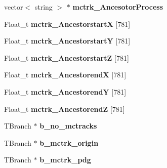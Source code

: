 \begin{DoxyCompactItemize}
\item 
\hypertarget{classanatree_a8e3f9971eb270265c29ed2363adf4b3d}{vector$<$ string $>$ $\ast$ {\bfseries mctrk\-\_\-\-Ancesotor\-Process}}\label{classanatree_a8e3f9971eb270265c29ed2363adf4b3d}

\item 
\hypertarget{classanatree_aee584eb9b9a6e4e342b671cef755f317}{Float\-\_\-t {\bfseries mctrk\-\_\-\-Ancestorstart\-X} \mbox{[}781\mbox{]}}\label{classanatree_aee584eb9b9a6e4e342b671cef755f317}

\item 
\hypertarget{classanatree_afe86037877e2e9a9c34088e9e9969212}{Float\-\_\-t {\bfseries mctrk\-\_\-\-Ancestorstart\-Y} \mbox{[}781\mbox{]}}\label{classanatree_afe86037877e2e9a9c34088e9e9969212}

\item 
\hypertarget{classanatree_ab9b2693c0fcd6663997e3f30a5e2e283}{Float\-\_\-t {\bfseries mctrk\-\_\-\-Ancestorstart\-Z} \mbox{[}781\mbox{]}}\label{classanatree_ab9b2693c0fcd6663997e3f30a5e2e283}

\item 
\hypertarget{classanatree_a72139522f1128add159c12ea49251a3e}{Float\-\_\-t {\bfseries mctrk\-\_\-\-Ancestorend\-X} \mbox{[}781\mbox{]}}\label{classanatree_a72139522f1128add159c12ea49251a3e}

\item 
\hypertarget{classanatree_a3a23da6ee0ed5c92ba7c9b43bfc23fb7}{Float\-\_\-t {\bfseries mctrk\-\_\-\-Ancestorend\-Y} \mbox{[}781\mbox{]}}\label{classanatree_a3a23da6ee0ed5c92ba7c9b43bfc23fb7}

\item 
\hypertarget{classanatree_ab17a4ab9716b391ea781e47c95566bf4}{Float\-\_\-t {\bfseries mctrk\-\_\-\-Ancestorend\-Z} \mbox{[}781\mbox{]}}\label{classanatree_ab17a4ab9716b391ea781e47c95566bf4}

\item 
\hypertarget{classanatree_aed3c214479009694c9e826d4cd9c24c8}{T\-Branch $\ast$ {\bfseries b\-\_\-no\-\_\-mctracks}}\label{classanatree_aed3c214479009694c9e826d4cd9c24c8}

\item 
\hypertarget{classanatree_ade8dd19db4fa261e089e58740901df75}{T\-Branch $\ast$ {\bfseries b\-\_\-mctrk\-\_\-origin}}\label{classanatree_ade8dd19db4fa261e089e58740901df75}

\item 
\hypertarget{classanatree_a8b921109ad1d0ff3a7ea3fc52a11edf2}{T\-Branch $\ast$ {\bfseries b\-\_\-mctrk\-\_\-pdg}}\label{classanatree_a8b921109ad1d0ff3a7ea3fc52a11edf2}


\end{DoxyCompactItemize}
